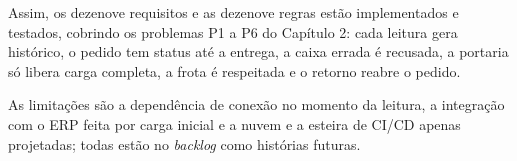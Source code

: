 Assim, os dezenove requisitos e as dezenove regras estão implementados e testados, cobrindo os problemas P1 a P6 do Capítulo 2: cada leitura gera histórico, o pedido tem status até a entrega, a caixa errada é recusada, a portaria só libera carga completa, a frota é respeitada e o retorno reabre o pedido.

As limitações são a dependência de conexão no momento da leitura, a integração com o ERP feita por carga inicial e a nuvem e a esteira de CI/CD apenas projetadas; todas estão no \textit{backlog} como histórias futuras.
